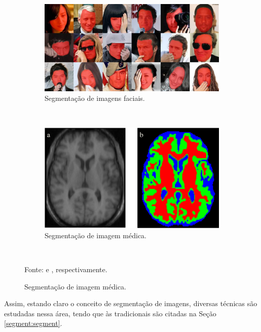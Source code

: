 \begin{figure}[H]
   \caption{Exemplos de segmentações de imagens.}
   \centering
   \label{segment:fig:1}
    \begin{subfigure}[t]{0.5\textwidth}
        \centering
        \includegraphics[width=1\linewidth]{recursos/imagens/image_seg/faces.png}
        \caption{Segmentação de imagens faciais.}
        \label{segment:fig:1.1}
    \end{subfigure}%
    ~ 

    \begin{subfigure}[t]{0.5\textwidth}
        \centering
        \includegraphics[width=1\linewidth]{recursos/imagens/image_seg/cerebro.png}
        \caption{Segmentação de imagem médica.}
        \label{segment:fig:1.2}
    \end{subfigure}%
    ~

    \vspace*{1 cm}
    Fonte: \cite{Nirkin2018} e \cite{Withey2008}, respectivamente.
\end{figure}

Assim, estando claro o conceito de segmentação de imagens, diversas técnicas são estudadas nessa área, tendo que às tradicionais são citadas na Seção \ref{segment:segment}.


